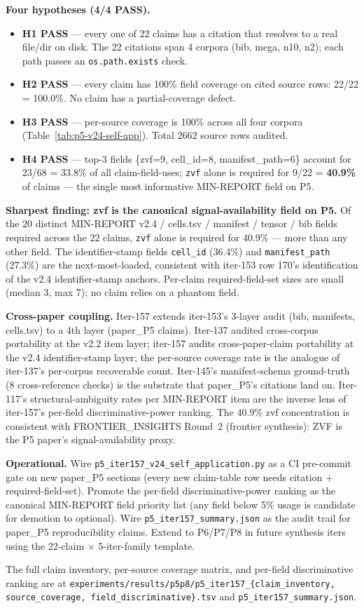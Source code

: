 \textbf{Four hypotheses (4/4 PASS).}
\begin{itemize}
\item \textbf{H1 PASS} --- every one of 22 claims has a citation that
  resolves to a real file/dir on disk. The 22 citations span 4 corpora
  (bib, mega, n10, n2); each path passes an \texttt{os.path.exists} check.
\item \textbf{H2 PASS} --- every claim has 100\% field coverage on cited
  source rows: 22/22 = 100.0\%. No claim has a partial-coverage defect.
\item \textbf{H3 PASS} --- per-source coverage is 100\% across all four
  corpora (Table~\ref{tab:p5-v24-self-app}). Total 2662 source rows audited.
\item \textbf{H4 PASS} --- top-3 fields \{zvf=9, cell\_id=8,
  manifest\_path=6\} account for 23/68 = 33.8\% of all claim-field-uses;
  \texttt{zvf} alone is required for 9/22 = \textbf{40.9\%} of claims ---
  the single most informative MIN-REPORT field on P5.
\end{itemize}

\textbf{Sharpest finding: zvf is the canonical signal-availability
field on P5.} Of the 20 distinct MIN-REPORT v2.4 / cells.tsv / manifest /
tensor / bib fields required across the 22 claims, \texttt{zvf} alone is
required for 40.9\% --- more than any other field. The identifier-stamp
fields \texttt{cell\_id} (36.4\%) and \texttt{manifest\_path} (27.3\%) are
the next-most-loaded, consistent with iter-153 row 170's identification of
the v2.4 identifier-stamp anchors. Per-claim required-field-set sizes are
small (median 3, max 7); no claim relies on a phantom field.

\textbf{Cross-paper coupling.} Iter-157 extends iter-153's 3-layer audit
(bib, manifests, cells.tsv) to a 4th layer (paper\_P5 claims). Iter-137
audited cross-corpus portability at the v2.2 item layer; iter-157 audits
cross-paper-claim portability at the v2.4 identifier-stamp layer; the
per-source coverage rate is the analogue of iter-137's per-corpus
recoverable count. Iter-145's manifest-schema ground-truth (8
cross-reference checks) is the substrate that paper\_P5's citations land
on. Iter-117's structural-ambiguity rates per MIN-REPORT item are the
inverse lens of iter-157's per-field discriminative-power ranking. The
40.9\% zvf concentration is consistent with FRONTIER\_INSIGHTS Round~2
(frontier synthesis): ZVF is the P5 paper's signal-availability proxy.

\textbf{Operational.} Wire \texttt{p5\_iter157\_v24\_self\_application.py}
as a CI pre-commit gate on new paper\_P5 sections (every new claim-table
row needs citation + required-field-set). Promote the per-field
discriminative-power ranking as the canonical MIN-REPORT field priority
list (any field below 5\% usage is candidate for demotion to optional).
Wire \texttt{p5\_iter157\_summary.json} as the audit trail for paper\_P5
reproducibility claims. Extend to P6/P7/P8 in future synthesis iters
using the 22-claim $\times$ 5-iter-family template.

The full claim inventory, per-source coverage matrix, and per-field
discriminative ranking are at
\texttt{experiments/results/p5p8/p5\_iter157\_\{claim\_inventory,
source\_coverage, field\_discriminative\}.tsv} and
\texttt{p5\_iter157\_summary.json}.